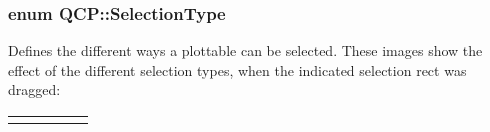 \subsubsection[{\texorpdfstring{Selection\+Type}{SelectionType}}]{\setlength{\rightskip}{0pt plus 5cm}enum {\bf Q\+C\+P\+::\+Selection\+Type}}\hypertarget{namespaceQCP_ac6cb9db26a564b27feda362a438db038}{}\label{namespaceQCP_ac6cb9db26a564b27feda362a438db038}
Defines the different ways a plottable can be selected. These images show the effect of the different selection types, when the indicated selection rect was dragged\+:

\begin{center} \tabulinesep=1mm
\begin{longtabu} spread 0pt [c]{*5{|X[-1]}|}
\hline
 & & & &  \\
\end{longtabu}
\end{center} 

